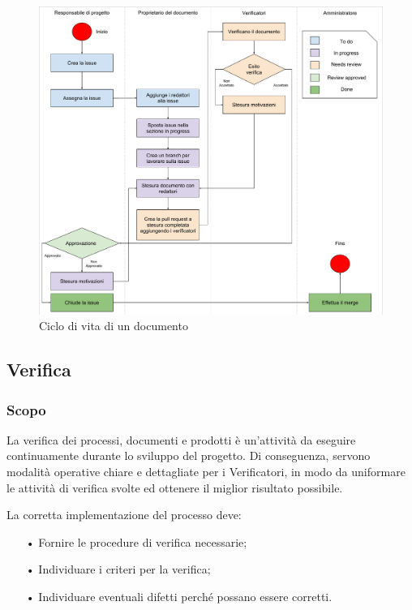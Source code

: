 \begin{figure}[H]
\centering
\includegraphics[width=17cm,trim=2 2 2 2, clip]{img/cicloVitaDocumento.pdf}
\caption{Ciclo di vita di un documento}
\label{fig:document_lifecycle}
\end{figure}

\subsection{Verifica}

\subsubsection{Scopo}

La verifica dei processi, documenti e prodotti è un'attività da eseguire continuamente durante lo sviluppo del progetto. Di conseguenza, servono modalità operative chiare e dettagliate per i Verificatori, in modo da uniformare le attività di verifica svolte ed ottenere il miglior risultato possibile. 

La corretta implementazione del processo deve:
\begin{itemize}
\item[•] Fornire le procedure di verifica necessarie; 
\item[•] Individuare i criteri per la verifica; 
\item[•] Individuare eventuali difetti perché possano essere corretti.
\end{itemize}

